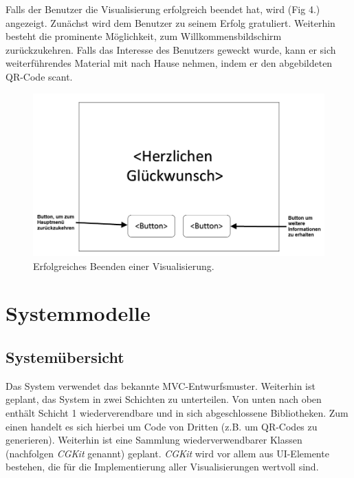\documentclass{article}
\begin{document}
Falls der Benutzer die Visualisierung erfolgreich beendet hat, wird (Fig 4.) angezeigt. Zunächst wird dem Benutzer zu seinem Erfolg gratuliert. Weiterhin besteht die prominente Möglichkeit, zum Willkommensbildschirm zurückzukehren. Falls das Interesse des Benutzers geweckt wurde, kann er sich weiterführendes Material mit nach Hause nehmen, indem er den abgebildeten QR-Code scant.

\begin{figure}[H]
  \centering
    \includegraphics[width=\textwidth]{resources/ui_walkthrough_end-draft}
  \caption{Erfolgreiches Beenden einer Visualisierung.}
\end{figure}


\section{Systemmodelle}

\subsection{Systemübersicht}
Das System verwendet das bekannte MVC-Entwurfsmuster. Weiterhin ist geplant, das System in zwei Schichten zu unterteilen. Von unten nach oben enthält Schicht 1 wiederverendbare und in sich abgeschlossene Bibliotheken. Zum einen handelt es sich hierbei um Code von Dritten (z.B. um QR-Codes zu generieren). Weiterhin ist eine Sammlung wiederverwendbarer Klassen (nachfolgen {\it CGKit} genannt) geplant. {\it CGKit} wird vor allem aus UI-Elemente bestehen, die für die Implementierung aller Visualisierungen wertvoll sind.
\end{document}

